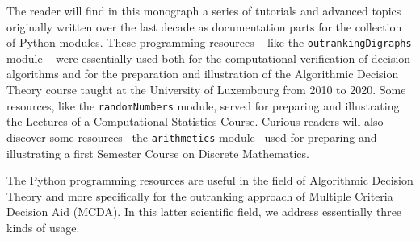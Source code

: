 %
%

\preface






The reader will find in this monograph a series of tutorials and advanced topics originally written over the last decade as documentation parts for the \Digraph collection of Python modules. These programming resources -- like the \texttt{outrankingDigraphs} module -- were essentially used both for the computational verification of decision algorithms and for the preparation and illustration of the Algorithmic Decision Theory course taught at the University of Luxembourg from 2010 to 2020. Some resources, like the \texttt{randomNumbers} module, served for preparing and illustrating the Lectures of a Computational Statistics Course. Curious readers will also discover some resources --the \texttt{arithmetics} module-- used for preparing and illustrating a first Semester Course on Discrete Mathematics.


The \Digraph Python programming resources are useful in the field of Algorithmic Decision Theory and more specifically for the outranking approach of Multiple Criteria Decision Aid (MCDA). In this latter scientific field, we address essentially three kinds of usage.

